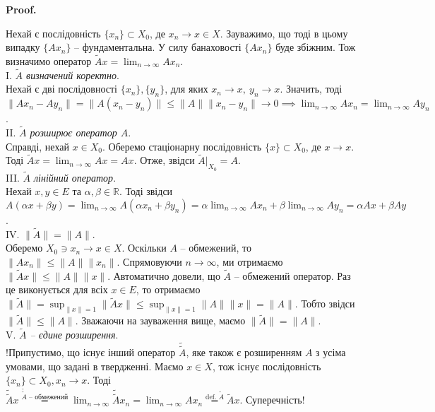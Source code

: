 \documentclass[a4paper, 10pt]{article}
\makeatletter
\theoremstyle{theoremdd}
\theoremstyle{theoremdd}
\theoremstyle{theoremdd}
\theoremstyle{theoremdd}
\theoremstyle{theoremdd}
\theoremstyle{theoremdd}
\theoremstyle{theoremdd}
\theoremstyle{theoremdd}
\renewenvironment{proof}[1][Proof.\\]{\par
\pushQED{\hfill \qed}%
\normalfont \topsep6\p@\@plus6\p@\relax
\trivlist
\item\relax
{\bfseries
#1\@addpunct{.}}\hspace\labelsep\ignorespaces
}{%
\popQED\endtrivlist\@endpefalse
}
\makeatother
\begin{document}
\begin{proof}
Нехай є послідовність $\{x_n\} \subset X_0$, де $x_n \to x \in X$. Зауважимо, що тоді в цьому випадку $\{Ax_n\}$ -- фундаментальна. У силу банаховості $\{Ax_n\}$ буде збіжним. Тож визначимо оператор $\tilde{A}x = \displaystyle\lim_{n \to \infty} Ax_n$.\\
I. \textit{$\tilde{A}$ визначений коректно}.\\
Нехай є дві послідовності $\{x_n\},\{y_n\}$, для яких $x_n \to x,\ y_n \to x$. Значить, тоді\\
$\|Ax_n - Ay_n\| = \|A(x_n-y_n)\| \leq \|A\| \|x_n-y_n\| \to 0 \implies \displaystyle\lim_{n \to \infty} Ax_n = \lim_{n \to \infty} Ay_n$.
\bigskip \\
II. \textit{$\tilde{A}$ розширює оператор $A$}.\\
Справді, нехай $x \in X_0$. Оберемо стаціонарну послідовність $\{x\} \subset X_0$, де $x \to x$. Тоді $\tilde{A}x = \displaystyle\lim_{n \to \infty} Ax = Ax$. Отже, звідси $\tilde{A}|_{X_0} = A$.
\bigskip \\
III. \textit{$\tilde{A}$ лінійний оператор}.\\
Нехай $x,y \in E$ та $\alpha,\beta \in \mathbb{R}$. Тоді звідси\\
$A(\alpha x + \beta y) = \displaystyle\lim_{n \to \infty} A(\alpha x_n + \beta y_n) = \alpha \lim_{n \to \infty} Ax_n + \beta \lim_{n \to \infty} Ay_n = \alpha Ax + \beta Ay$.
\bigskip \\
\iffalse
IV. \textit{$\tilde{A}$ -- обмежений оператор}.\\
Оберемо послідовність $\{x_n\} \subset X$ так, що $x_n \to 0$. Тоді\\
$\|\tilde{A}x_n\| = \displaystyle \| \lim_{m \to \infty} A x_n^{(m)} \| = \lim_{m \to \infty} \|A x_n^{(m)}\| \leq \lim_{m \to \infty} \|A\| \|x_n^{(m)}\| = \|A\| \| \lim_{m \to \infty} x_n^{(m)} \| = \|A\| \|x_n\| \to 0$ при $n \to \infty \implies \tilde{A}x_n \to A0$.
\bigskip \\
\fi
IV. $\|\tilde{A}\| = \|A\|$.\\
Оберемо $X_0 \ni x_n \to x \in X$. Оскільки $A$ -- обмежений, то $\|Ax_n\| \leq \|A\| \|x_n\|$. Спрямовуючи $n \to \infty$, ми отримаємо $\|\tilde{A}x\| \le \|A\| \|x\|$. Автоматично довели, що $\tilde{A}$ -- обмежений оператор. Раз це виконується для всіх $x \in E$, то отримаємо $\|\tilde{A}\|= \displaystyle\sup_{\|x\| = 1} \|\tilde{A}x\| \leq \sup_{\|x\| = 1} \|A\| \|x\| = \|A\|$. Тобто звідси $\|\tilde{A}\| \leq \|A\|$. Зважаючи на зауваження вище, маємо $\|\tilde{A}\| = \|A\|$.
\bigskip \\
V. \textit{$\tilde{A}$ -- єдине розширення}.\\
!Припустимо, що існує інший оператор $\tilde{\tilde{A}}$, яке також є розширенням $A$ з усіма умовами, що задані в твердженні. Маємо $x \in X$, тож існує послідовність $\{x_n\} \subset X_0, x_n \to x$. Тоді\\
$\tilde{\tilde{A}}x \overset{\tilde{\tilde{A}} \text{ -- обмежений}}{=} \displaystyle\lim_{n \to \infty} \tilde{\tilde{A}}x_n = \lim_{n \to \infty} Ax_n \overset{\text{def. } \tilde{A}}{=} \tilde{A}x$. Суперечність!
\end{proof}
\end{document}
